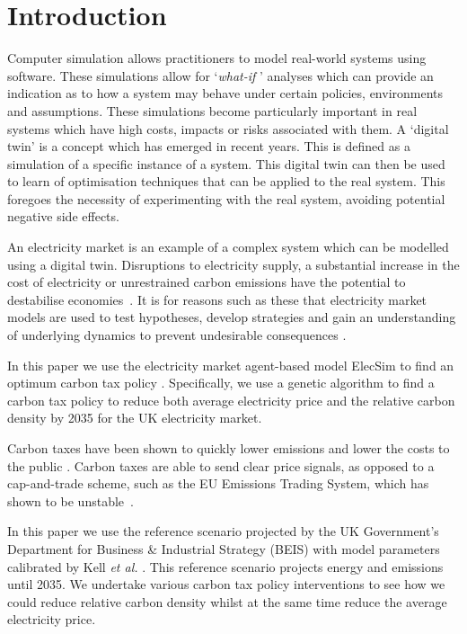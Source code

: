 \documentclass[sigconf]{acmart}
\begin{document}
\section{Introduction}



Computer simulation allows practitioners to model real-world systems using software. These simulations allow for `\textit{what-if} ' analyses which can provide an indication as to how a system may behave under certain policies, environments and assumptions. These simulations become particularly important in real systems which have high costs, impacts or risks associated with them. A `digital twin' is a concept which has emerged in recent years. This is defined as a simulation of a specific instance of a system. This digital twin can then be used to learn of optimisation techniques that can be applied to the real system. This foregoes the necessity of experimenting with the real system, avoiding potential negative side effects.


An electricity market is an example of a complex system which can be modelled using a digital twin. Disruptions to electricity supply, a substantial increase in the cost of electricity or unrestrained carbon emissions have the potential to destabilise economies~\cite{Kaseke2013,Masson-Delmotte2018}. It is for reasons such as these that electricity market models are used to test hypotheses, develop strategies and gain an understanding of underlying dynamics to prevent undesirable consequences \cite{Jebaraj2006}. 

In this paper we use the electricity market agent-based model ElecSim to find an optimum carbon tax policy \cite{Kell}. Specifically, we use a genetic algorithm to find a carbon tax policy to reduce both average electricity price and the relative carbon density by 2035 for the UK electricity market. 

Carbon taxes have been shown to quickly lower emissions and lower the costs to the public \cite{Wittneben2009}. Carbon taxes are able to send clear price signals, as opposed to a cap-and-trade scheme, such as the EU Emissions Trading System, which has shown to be unstable~\cite{Wittneben2009}.

In this paper we use the reference scenario projected by the UK Government's Department for Business \& Industrial Strategy (BEIS) with model parameters calibrated by Kell \textit{et al.} \cite{DBEIS2019,Kell2020}. This reference scenario projects energy and emissions until 2035. We undertake various carbon tax policy interventions to see how we could reduce relative carbon density whilst at the same time reduce the average electricity price.
\end{document}
